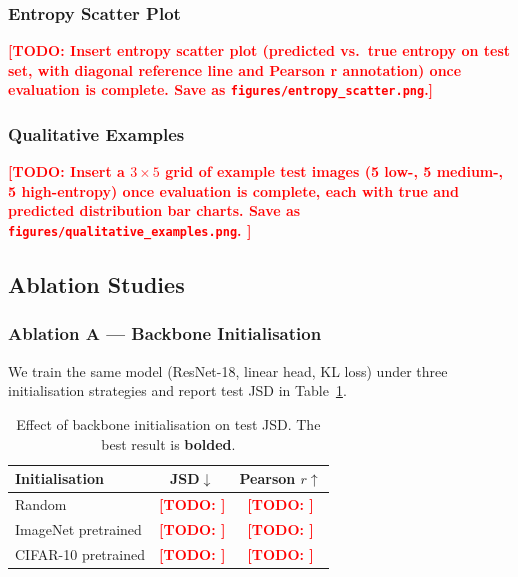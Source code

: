 \documentclass[11pt,a4paper]{article}
\newcommand{\todo}[1]{\textcolor{red}{\textbf{[TODO: #1]}}}
\begin{document}
\subsubsection{Entropy Scatter Plot}

\todo{Insert entropy scatter plot (predicted vs.\ true entropy on test set,
with diagonal reference line and Pearson r annotation) once evaluation is
complete. Save as \texttt{figures/entropy\_scatter.png}.}


\subsubsection{Qualitative Examples}

\todo{%
  Insert a $3 \times 5$ grid of example test images (5 low-, 5 medium-,
  5 high-entropy) once evaluation is complete, each with true and predicted
  distribution bar charts.
  Save as \texttt{figures/qualitative\_examples.png}.
}

\subsection{Ablation Studies}

\subsubsection{Ablation A — Backbone Initialisation}

We train the same model (ResNet-18, linear head, KL loss) under three
initialisation strategies and report test JSD in Table~\ref{tab:ablation_init}.

\begin{table}[H]
\centering
\caption{%
  Effect of backbone initialisation on test JSD.
  The best result is \textbf{bolded}.
}
\label{tab:ablation_init}
\begin{tabular}{lcc}
\toprule
\textbf{Initialisation} & \textbf{JSD}$\downarrow$ & \textbf{Pearson $r$}$\uparrow$ \\
\midrule
Random                 & \todo{} & \todo{} \\
ImageNet pretrained    & \todo{} & \todo{} \\
CIFAR-10 pretrained    & \todo{} & \todo{} \\
\bottomrule
\end{tabular}
\end{table}
\end{document}
